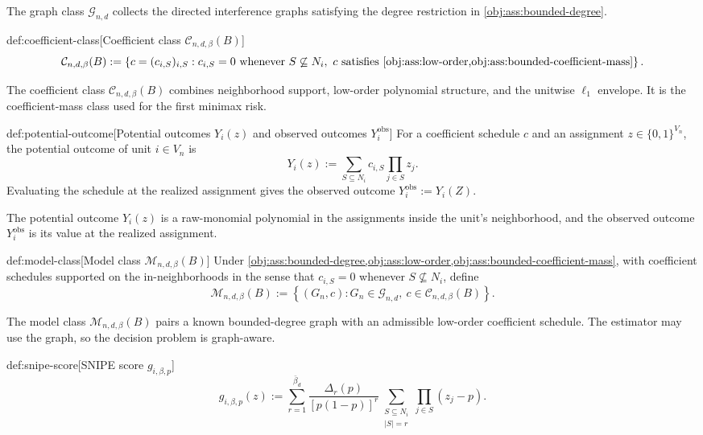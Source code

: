 The graph class \(\mathcal G_{n,d}\) collects the directed interference graphs satisfying the degree restriction in \cref{obj:ass:bounded-degree}.

\begin{definitionv}{def:coefficient-class}[Coefficient class $\mathcal C_{n,d,\beta}(B)$]
\[
\mathcal C_{n,d,\beta}(B)
:=
\left\{
c=(c_{i,S})_{i,S}:
c_{i,S}=0 \text{ whenever } S\not\subseteq N_i,
\ c \text{ satisfies } \cref{obj:ass:low-order,obj:ass:bounded-coefficient-mass}
\right\}.
\]
\end{definitionv}

The coefficient class \(\mathcal C_{n,d,\beta}(B)\) combines neighborhood support, low-order polynomial structure, and the unitwise \(\ell_1\) envelope. It is the coefficient-mass class used for the first minimax risk.

\begin{definitionv}{def:potential-outcome}[Potential outcomes $Y_i(z)$ and observed outcomes $Y_i^{\mathrm{obs}}$]
For a coefficient schedule \(c\) and an assignment \(z\in\{0,1\}^{V_n}\), the potential outcome of unit \(i\in V_n\) is
\[
Y_i(z)
:=
\sum_{S\subseteq N_i} c_{i,S}\prod_{j\in S} z_j .
\]
Evaluating the schedule at the realized assignment gives the observed outcome \(Y_i^{\mathrm{obs}}:=Y_i(Z)\).
\end{definitionv}

The potential outcome \(Y_i(z)\) is a raw-monomial polynomial in the assignments inside the unit's neighborhood, and the observed outcome \(Y_i^{\mathrm{obs}}\) is its value at the realized assignment.

\begin{definitionv}{def:model-class}[Model class \(\mathcal M_{n,d,\beta}(B)\)]
Under \cref{obj:ass:bounded-degree,obj:ass:low-order,obj:ass:bounded-coefficient-mass}, with coefficient schedules supported on the in-neighborhoods in the sense that \(c_{i,S}=0\) whenever \(S\not\subseteq N_i\), define
\[
\mathcal M_{n,d,\beta}(B)
:=
\left\{
(G_n,c):
G_n\in\mathcal G_{n,d},\ 
c\in\mathcal C_{n,d,\beta}(B)
\right\}.
\]
\end{definitionv}

The model class \(\mathcal M_{n,d,\beta}(B)\) pairs a known bounded-degree graph with an admissible low-order coefficient schedule. The estimator may use the graph, so the decision problem is graph-aware.

\begin{definitionv}{def:snipe-score}[SNIPE score $g_{i,\beta,p}$]
\[
g_{i,\beta,p}(z)
:=
\sum_{r=1}^{\bar\beta_d}
\frac{\Delta_r(p)}{[p(1-p)]^r}
\sum_{\substack{S\subseteq N_i\\ |S|=r}}
\prod_{j\in S}(z_j-p).
\]
\end{definitionv}

